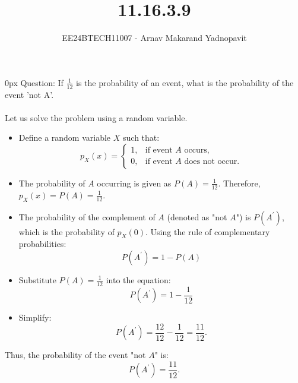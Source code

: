 \documentclass[journal,12pt,onecolumn]{IEEEtran}
\theoremstyle{remark}
\begin{document}
\title{11.16.3.9}
\author{EE24BTECH11007 - Arnav Makarand Yadnopavit}
\maketitle
\renewcommand{\thefigure}{\theenumi}
\renewcommand{\thetable}{\theenumi}
\parindent 0px Question: If $\frac{1}{12}$ is the probability of an event, what is the probability of the event 'not A'.\\
\solution\\
Let us solve the problem using a random variable.
\begin{itemize}
    \item Define a random variable $ X $ such that:
    \[
    p_X(x) =
    \begin{cases}
    1, & \text{if event } A \text{ occurs}, \\
    0, & \text{if event } A \text{ does not occur}.
    \end{cases}
    \]

    \item The probability of $ A $ occurring is given as $ P(A) = \frac{1}{12} $.  
    Therefore, $ p_X(x) = P(A) = \frac{1}{12} $.

    \item The probability of the complement of $ A $ (denoted as "not $ A $") is $ P(A^\prime) $, which is the probability of $p_X(0)$. Using the rule of complementary probabilities:
    \[
    P(A^\prime) = 1 - P(A)
    \]

    \item Substitute $ P(A) = \frac{1}{12} $ into the equation:
    \[
    P(A^\prime) = 1 - \frac{1}{12}
    \]

    \item Simplify:
    \[
    P(A^\prime) = \frac{12}{12} - \frac{1}{12} = \frac{11}{12}.
    \]
\end{itemize}

Thus, the probability of the event "not $ A $" is:
\[
P(A^\prime) = \frac{11}{12}.
\]
\end{document}

